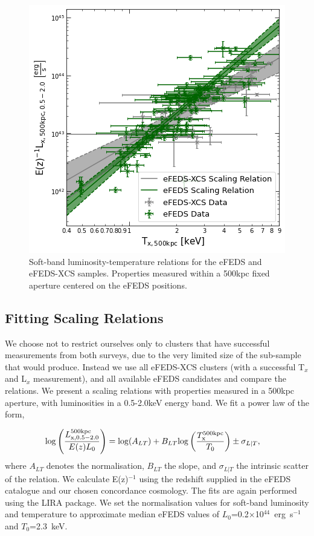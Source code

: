 \documentclass[fleqn,usenatbib]{mnras}
\begin{document}
\begin{figure}
    \centering
    \includegraphics[width=0.95\columnwidth]{images/efeds_xcs_wdata_lt52.png}
    \caption[]{Soft-band luminosity-temperature relations for the eFEDS and eFEDS-XCS samples. Properties measured within a 500kpc fixed aperture centered on the eFEDS positions.}
    \label{fig:efedsandxcslt}
\end{figure}

\subsection{Fitting Scaling Relations}

We choose not to restrict ourselves only to clusters that have successful measurements from both surveys, due to the very limited size of the sub-sample that would produce. Instead we use all eFEDS-XCS clusters (with a successful T$_{x}$ and L$_{x}$ measurement), and all available eFEDS candidates and compare the relations. We present a scaling relations with properties measured in a 500kpc aperture, with luminosities in a 0.5-2.0keV energy band. We fit a power law of the form, 

\begin{align}
{\rm log}\left(\frac{L^{500\rm{kpc}}_{\rm{x, 0.5-2.0}}}{E(z)L_{0}}\right) &= {\rm log}(A_{LT}) + B_{LT}{\rm log}\left(\frac{T^{\rm{500kpc}}_{\rm{x}}}{T_{0}}\right) \pm \sigma_{L|T},
\label{equ:lt}
\end{align}
where $A_{LT}$ denotes the normalisation, $B_{LT}$ the slope, and $\sigma_{L|T}$ the intrinsic scatter of the relation. We calculate E(z)$^{-1}$ using the redshift supplied in the eFEDS catalogue and our chosen concordance cosmology.  The fits are again performed using the LIRA package. We set the normalisation values for soft-band luminosity and temperature to approximate median eFEDS values of $L_{0}$=0.2$\times$10$^{44}$~erg~s$^{-1}$ and $T_{0}$=2.3~keV.
\end{document}
